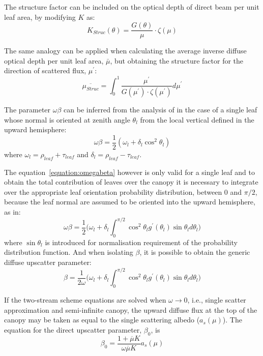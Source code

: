 The structure factor can be included on the optical depth of direct beam per unit leaf area, by modifying $K$ as:
\begin{equation}
K_{Struc}(\theta) = \frac{G(\theta)}{\mu} \cdot  \zeta(\mu)
\label{equation:opticaldepthstruct}
\end{equation}

The same analogy can be applied when calculating the average inverse diffuse optical depth per unit leaf area, $\bar{\mu}$, but obtaining the structure factor for the direction of scattered flux, $\mu^\prime$:
\begin{equation}
\overline{\mu_{Struc}} = \int_{0}^{1} \frac{\mu^\prime}{G(\mu^\prime) \cdot \zeta(\mu^\prime)} d\mu^\prime
\label{equation:muprimestruct}
\end{equation}

The parameter $\omega\beta$ can be inferred from the analysis of \citet{Norman1975} in the case of a single leaf whose normal is oriented at zenith angle $\theta_l$ from the local vertical defined in the upward hemisphere:
\begin{equation}
\omega\beta = \frac{1}{2}(\omega_l + \delta_l \cos^2 \theta_l)
\label{equation:omegabeta}
\end{equation}
\noindent where $\omega_l = \rho_{leaf} + \tau_{leaf}$ and $\delta_l = \rho_{leaf} - \tau_{leaf}$. 

The equation~\ref{equation:omegabeta} however is only valid for a single leaf and to obtain the total contribution of leaves over the canopy it is necessary to integrate over the appropriate leaf orientation probability distribution, between 0 and $\pi/2$, because the leaf normal are assumed to be oriented into the upward hemisphere, as in:
\begin{equation}
\omega\beta = \frac{1}{2}\Big(\omega_l + \delta_l \int_{0}^{\pi/2} \cos^2 \theta_l g^\prime(\theta_l) \sin \theta_l d\theta_l\Big)
\label{equation:omegabeta2}
\end{equation}
\noindent where $\sin\theta_l$ is introduced for normalisation requirement of the probability distribution function. And when isolating $\beta$, it is possible to obtain the generic diffuse upscatter parameter:
\begin{equation}
\beta = \frac{1}{2\omega}\Big(\omega_l + \delta_l \int_{0}^{\pi/2} \cos^2 \theta_l g^\prime(\theta_l) \sin \theta_l d\theta_l\Big)
\label{equation:beta}
\end{equation}

If the two-stream scheme equations are solved when $\omega \rightarrow 0$, i.e., single scatter approximation and semi-infinite canopy, the upward diffuse flux at the top of the canopy may be taken as equal to the single scattering albedo ($a_s(\mu)$). The equation for the direct upscatter parameter, $\beta_0$, is
\begin{equation}
\beta_0 = \frac{1 + \overline{\mu}K}{\omega\overline{\mu}K}a_s(\mu)
\label{equation:betazero}
\end{equation}

